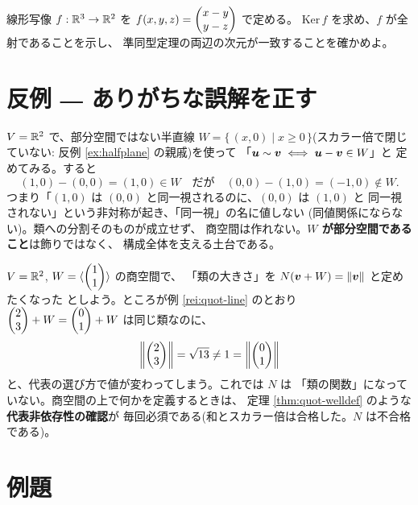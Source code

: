 \begin{mondai}\label{q:quot}
線形写像 $f : \mathbb{R}^3 \to \mathbb{R}^2$ を $f(x, y, z) = \begin{pmatrix}x - y \\ y - z\end{pmatrix}$ で定める。
$\mathrm{Ker}\,f$ を求め、$f$ が全射であることを示し、
準同型定理の両辺の次元が一致することを確かめよ。
\end{mondai}

\section{反例 ― ありがちな誤解を正す}

\begin{hanrei}\label{hanrei:quot-notsub}
$V = \mathbb{R}^2$ で、部分空間ではない半直線
$W = \{\, (x, 0) \mid x \ge 0 \,\}$(スカラー倍で閉じていない:
反例 \ref{ex:halfplane} の親戚)を使って
「$\bm{u} \sim \bm{v} \iff \bm{u} - \bm{v} \in W$」と
定めてみる。すると
\[
(1, 0) - (0, 0) = (1, 0) \in W \quad\text{だが}\quad
(0, 0) - (1, 0) = (-1, 0) \notin W.
\]
つまり「$(1,0)$ は $(0,0)$ と同一視されるのに、$(0,0)$ は $(1,0)$ と
同一視されない」という非対称が起き、「同一視」の名に値しない
(同値関係にならない)。類への分割そのものが成立せず、
商空間は作れない。\textbf{$W$ が部分空間であること}は飾りではなく、
構成全体を支える土台である。
\end{hanrei}

\begin{hanrei}\label{hanrei:quot-illdef}
$V = \mathbb{R}^2$, $W = \langle \begin{pmatrix}1 \\ 1\end{pmatrix} \rangle$ の商空間で、
「類の大きさ」を $N(\bm{v} + W) = \|\bm{v}\|$ と定めたくなった
としよう。ところが例 \ref{rei:quot-line} のとおり
$\begin{pmatrix}2 \\ 3\end{pmatrix} + W = \begin{pmatrix}0 \\ 1\end{pmatrix} + W$ は同じ類なのに、
\[
\left\|\begin{pmatrix}2 \\ 3\end{pmatrix}\right\| = \sqrt{13} \neq 1 = \left\|\begin{pmatrix}0 \\ 1\end{pmatrix}\right\|
\]
と、代表の選び方で値が変わってしまう。これでは $N$ は
「類の関数」になっていない。商空間の上で何かを定義するときは、
定理 \ref{thm:quot-welldef} のような\textbf{代表非依存性の確認}が
毎回必須である(和とスカラー倍は合格した。$N$ は不合格である)。
\end{hanrei}

\section{例題}

